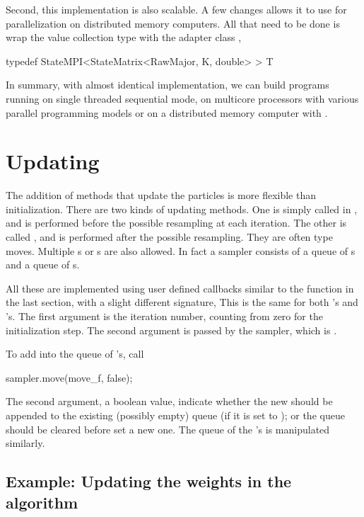 Second, this implementation is also scalable. A few changes allows it to use
\mpi for parallelization on distributed memory computers. All that need to be
done is wrap the value collection type with the adapter class
,
\begin{cppcode}
typedef StateMPI<StateMatrix<RawMajor, K, double> > T
\end{cppcode}

In summary, with almost identical implementation, we can build programs
running on single threaded sequential mode, on multicore processors with
various parallel programming models or on a distributed memory computer with
\mpi.

\section{Updating}
\label{sec:Updating}

The addition of methods that update the particles is more flexible than
initialization. There are two kinds of updating methods. One is simply called
 in \vsmc, and is performed before the possible resampling at
each iteration. The other is called , and is performed after
the possible resampling. They are often \mcmc type moves. Multiple
s or s are also allowed. In fact a \vsmc
sampler consists of a queue of s and a queue of
s.

All these are implemented using user defined callbacks similar to the
 function in the last section, with a slight different
signature,
This is the same for both 's and 's. The first
argument is the iteration number, counting from zero for the initialization
step. The second argument is passed by the sampler, which is
.

To add  into the queue of 's, call
\begin{cppcode}
sampler.move(move_f, false);
\end{cppcode}
The second argument, a boolean value, indicate whether the new
 should be appended to the existing (possibly empty) queue (if
it is set to ); or the queue should be cleared before set a
new one. The queue of the 's is manipulated similarly.

\subsection{Example: Updating the weights in the \smc[2] algorithm}
\label{sub:Example: Updating the weights in the SMC2 algorithm}

